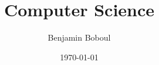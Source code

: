 \documentclass{memoir}
\title{Computer Science}
\author{Benjamin Boboul}
\date{\today}
\begin{document}
    \frontmatter
    \maketitle

    \mainmatter
    

    \backmatter
    \tableofcontents
    \listoffigures
    \listoftables
    \printglossaries
\end{document}
